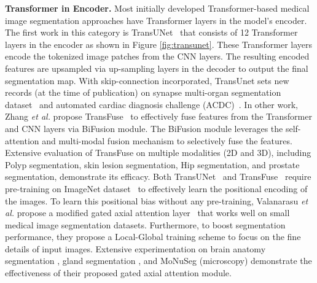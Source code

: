 \documentclass[10pt,journal,compsoc]{IEEEtran}
\begin{document}
{{\textbf{Transformer in Encoder.}}} Most initially developed Transformer-based medical image segmentation approaches have Transformer layers in the model's encoder.
The first work in this category is TransUNet~\cite{chen2021transunet} that consists of 12 Transformer layers in the encoder as shown in Figure \ref{fig:transunet}. These Transformer layers encode the tokenized image patches from the CNN layers.
The resulting encoded features are upsampled via up-sampling layers in the decoder to output the final segmentation map. With skip-connection incorporated, TransUnet sets new records (at the time of publication) on synapse multi-organ segmentation dataset~\cite{synapse} and automated cardiac diagnosis challenge (ACDC)~\cite{bernard2018deep}.
In other work, Zhang \textit{et al.} propose TransFuse~\cite{zhang2021transfuse} to effectively fuse features from the Transformer and CNN layers via BiFusion module.
The BiFusion module leverages the self-attention and multi-modal fusion mechanism to selectively fuse the features.
Extensive evaluation of TransFuse on multiple modalities (2D and 3D), including Polyp segmentation, skin lesion segmentation, Hip segmentation, and prostate segmentation, demonstrate its efficacy. %
Both TransUNet~\cite{chen2021transunet} and TransFuse~\cite{zhang2021transfuse} require pre-training on ImageNet dataset~\cite{deng2009imagenet} to effectively learn the positional encoding of the images. To learn this positional bias without any pre-training, Valanarasu \textit{et al.} \cite{valanarasu2021medical} propose a modified gated axial attention layer~\cite{wang2020axial} that works well on small medical image segmentation datasets. Furthermore, to boost segmentation performance, they propose a Local-Global training scheme to focus on the fine details of input images.
Extensive experimentation on brain anatomy segmentation \cite{wang2018automatic}, gland segmentation \cite{sirinukunwattana2017gland}, and MoNuSeg (microscopy) \cite{kumar2019multi} demonstrate the effectiveness of their proposed gated axial attention module.
\end{document}
